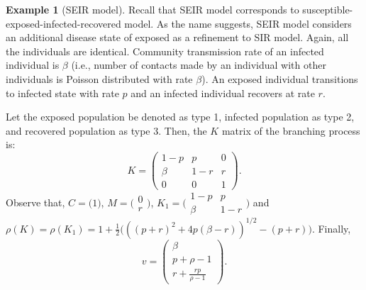\documentclass{article}
\theoremstyle{definition}
\newtheorem{example}{Example}
\begin{document}
\begin{example}[SEIR model]
Recall that SEIR model corresponds to susceptible-exposed-infected-recovered model. As the name suggests, SEIR model considers an additional disease state of exposed as a refinement to SIR model. Again, all the individuals are identical. Community transmission rate of an infected individual is $\beta$ (i.e., number of contacts made by an individual with other individuals is Poisson distributed with rate $\beta$). An exposed individual transitions to infected state with rate $p$ and an infected individual recovers at rate $r$. 

Let the exposed population be denoted as type 1, infected population as type 2, and recovered population as type 3. Then, the  $K$ matrix of the branching process is:
\[K=\left ( \begin{matrix} 1-p & p & 0 \\ \beta & 1-r & r \\ 0 & 0 & 1 \end{matrix} \right ).\]
Observe that, $C=\big(1\big)$, $M=\big(\begin{smallmatrix} 0 \\ r\end{smallmatrix}\big)$, $K_1 = \big(\begin{smallmatrix} 1-p  & p \\ \beta & 1-r\end{smallmatrix}\big)$ and $\rho(K) =\rho(K_1)=1+\frac{1}{2}\big(((p+r)^2+4p(\beta-r))^{1/2}-(p+r)\big)$.
Finally, 
\[v = \left (\begin{matrix} \beta \\ p+\rho-1 \\ r+\frac{rp}{\rho-1}\end{matrix} \right).\]


\end{example}
\end{document}
